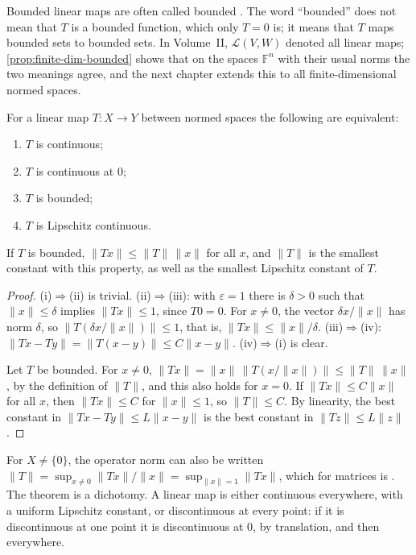 Bounded linear maps are often called bounded . The word ``bounded'' does not mean that $T$ is a bounded function, which only $T=0$ is; it means that $T$ maps bounded sets to bounded sets. In Volume~II, $\mathcal L(V,W)$ denoted all linear maps; \cref{prop:finite-dim-bounded} shows that on the spaces $\mathbb F^n$ with their usual norms the two meanings agree, and the next chapter extends this to all finite-dimensional normed spaces.

\begin{theorem}
\label{thm:bounded-continuous}
For a linear map $T\colon X\to Y$ between normed spaces the following are equivalent:
\begin{enumerate}
\item $T$ is continuous;
\item $T$ is continuous at $0$;
\item $T$ is bounded;
\item $T$ is Lipschitz continuous.
\end{enumerate}
If $T$ is bounded, $\|Tx\|\le\|T\|\,\|x\|$ for all $x$, and $\|T\|$ is the smallest constant with this property, as well as the smallest Lipschitz constant of $T$.
\end{theorem}

\begin{proof}
(i)$\Rightarrow$(ii) is trivial. (ii)$\Rightarrow$(iii): with $\varepsilon=1$ there is $\delta>0$ such that $\|x\|\le\delta$ implies $\|Tx\|\le1$, since $T0=0$. For $x\ne0$, the vector $\delta x/\|x\|$ has norm $\delta$, so $\|T(\delta x/\|x\|)\|\le1$, that is, $\|Tx\|\le\|x\|/\delta$. (iii)$\Rightarrow$(iv): $\|Tx-Ty\|=\|T(x-y)\|\le C\|x-y\|$. (iv)$\Rightarrow$(i) is clear.

Let $T$ be bounded. For $x\ne0$, $\|Tx\|=\|x\|\,\|T(x/\|x\|)\|\le\|T\|\,\|x\|$, by the definition of $\|T\|$, and this also holds for $x=0$. If $\|Tx\|\le C\|x\|$ for all $x$, then $\|Tx\|\le C$ for $\|x\|\le1$, so $\|T\|\le C$. By linearity, the best constant in $\|Tx-Ty\|\le L\|x-y\|$ is the best constant in $\|Tz\|\le L\|z\|$.
\end{proof}

For $X\ne\{0\}$, the operator norm can also be written $\|T\|=\sup_{x\ne0}\|Tx\|/\|x\|=\sup_{\|x\|=1}\|Tx\|$, which for matrices is . The theorem is a dichotomy. A linear map is either continuous everywhere, with a uniform Lipschitz constant, or discontinuous at every point: if it is discontinuous at one point it is discontinuous at $0$, by translation, and then everywhere.

